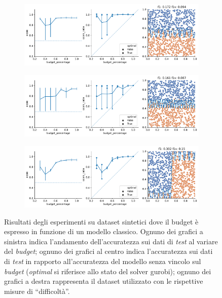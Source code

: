 \begin{figure}
\begin{subfigure}{.5\textwidth}
    \end{subfigure}%
    \hfill
    \begin{subfigure}{.5\textwidth}
        \centering
        \includegraphics[width=\textwidth]{img/2d/13.pdf}
    \end{subfigure}%
    \begin{subfigure}{.5\textwidth}
        \centering
        \includegraphics[width=\textwidth]{img/2d/14.pdf}
    \end{subfigure}%
    \hfill
    \begin{subfigure}{.5\textwidth}
        \centering
        \includegraphics[width=\textwidth]{img/2d/15.pdf}
    \end{subfigure}%
    \caption{Risultati degli esperimenti su dataset sintetici dove il budget è espresso in funzione di un modello classico. Ognuno dei grafici a sinistra indica l'andamento dell'accuratezza sui dati di \emph{test} al variare del \emph{budget}; ognuno dei grafici al centro indica l'accuratezza sui dati di \emph{test} in rapporto all'accuratezza del modello senza vincolo sul \emph{budget} (\emph{optimal} si riferisce allo stato del solver gurobi); ognuno dei grafici a destra rappresenta il dataset utilizzato con le rispettive misure di ``difficoltà''.}
\label{fig:risultati_2d_2}
\end{figure}

